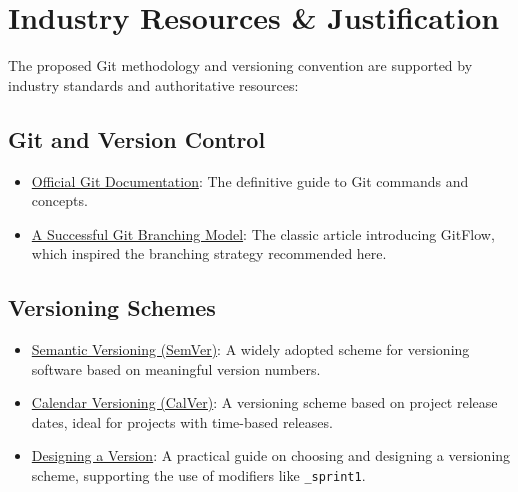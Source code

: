 \section{Industry Resources \& Justification}
The proposed Git methodology and versioning convention are supported by industry standards and authoritative resources:

\subsection*{Git and Version Control}
\begin{itemize}
    \item \href{https://git-scm.com/doc}{Official Git Documentation}: The definitive guide to Git commands and concepts.
    \item \href{https://nvie.com/posts/a-successful-git-branching-model/}{A Successful Git Branching Model}: The classic article introducing GitFlow, which inspired the branching strategy recommended here.
\end{itemize}

\subsection*{Versioning Schemes}
\begin{itemize}
    \item \href{https://semver.org/}{Semantic Versioning (SemVer)}: A widely adopted scheme for versioning software based on meaningful version numbers.
    \item \href{https://calver.org/}{Calendar Versioning (CalVer)}: A versioning scheme based on project release dates, ideal for projects with time-based releases.
    \item \href{https://sedimental.org/designing_a_version.html}{Designing a Version}: A practical guide on choosing and designing a versioning scheme, supporting the use of modifiers like \texttt{\_sprint1}.
\end{itemize}